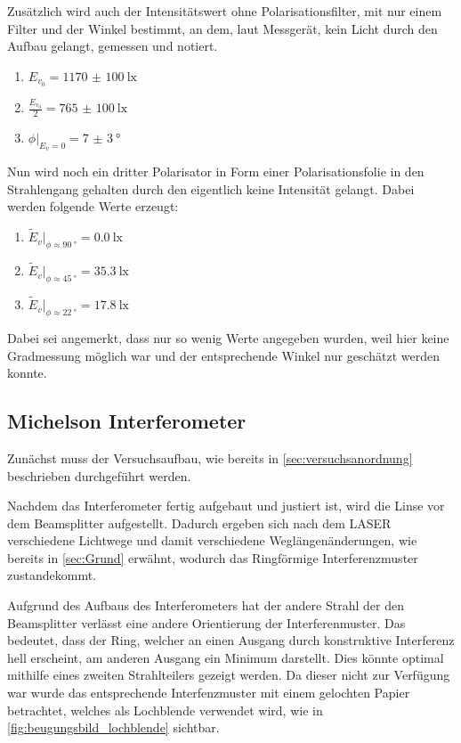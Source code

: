 \documentclass[12pt,english,ngerman]{scrartcl}
\begin{document}
Zusätzlich wird auch der Intensitätswert ohne Polarisationsfilter, mit nur
einem Filter und der Winkel bestimmt, an dem, laut Messgerät, kein Licht durch
den Aufbau gelangt, gemessen und notiert.

\begin{enumerate}
	\item $E_{v_0}=\SI{1170(100)}{\lux}$
	\item $\frac{E_{v_0}}{2}=\SI{765(100)}{\lux}$
	\item $\phi|_{E_v=0}=\SI{7(3)}{\degree}$
\end{enumerate}

Nun wird noch ein dritter Polarisator in Form einer Polarisationsfolie in den
Strahlengang gehalten durch den eigentlich keine Intensität gelangt. Dabei
werden folgende Werte erzeugt:

\begin{enumerate}
	\item $\tilde{E}_v|_{\phi\approx\SI{90}{\degree}}=\SI{0.0}{\lux}$
	\item $\tilde{E}_v|_{\phi\approx\SI{45}{\degree}}=\SI{35.3}{\lux}$
	\item $\tilde{E}_v|_{\phi\approx\SI{22}{\degree}}=\SI{17.8}{\lux}$
\end{enumerate}

Dabei sei angemerkt, dass nur so wenig Werte angegeben wurden, weil hier keine
Gradmessung möglich war und der entsprechende Winkel nur geschätzt werden
konnte.

\subsection{Michelson Interferometer}

Zunächst muss der Versuchsaufbau, wie bereits in
\autoref{sec:versuchsanordnung} beschrieben durchgeführt werden.

Nachdem das Interferometer fertig aufgebaut und justiert ist, wird die Linse
vor dem Beamsplitter aufgestellt. Dadurch ergeben sich nach dem LASER
verschiedene Lichtwege und damit verschiedene Weglängenänderungen, wie bereits
in \autoref{sec:Grund} erwähnt, wodurch das Ringförmige Interferenzmuster
zustandekommt.

Aufgrund des Aufbaus des Interferometers hat der andere Strahl der den
Beamsplitter verlässt eine andere Orientierung der Interferenmuster. Das
bedeutet, dass der Ring, welcher an einen Ausgang durch konstruktive
Interferenz hell erscheint, am anderen Ausgang ein Minimum darstellt. Dies
könnte optimal mithilfe eines zweiten Strahlteilers gezeigt werden. Da dieser
nicht zur Verfügung war wurde das entsprechende Interfenzmuster mit einem
gelochten Papier betrachtet, welches als Lochblende verwendet wird, wie in
\autoref{fig:beugungsbild_lochblende} sichtbar.
\end{document}
